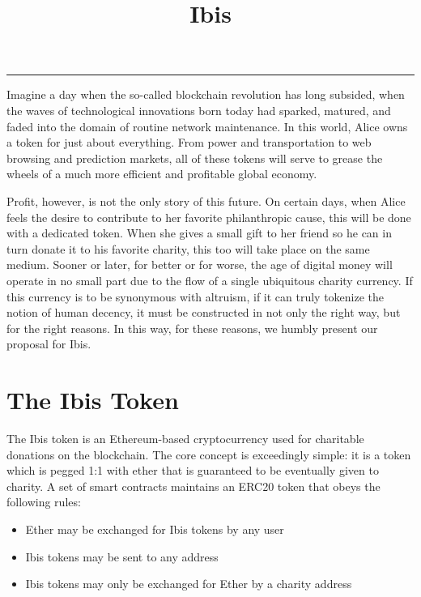 \documentclass{article} \usepackage{parskip} \usepackage{titlesec}
\title{\vspace{-5ex}Ibis} \date{\vspace{-10ex}}
\begin{document}
\maketitle
\noindent\rule{\textwidth}{1pt}

Imagine a day when the so-called blockchain revolution has long subsided, when
the waves of technological innovations born today had sparked, matured, and
faded into the domain of routine network maintenance. In this world, Alice owns
a token for just about everything. From power and transportation to web browsing
and prediction markets, all of these tokens will serve to grease the wheels of a
much more efficient and profitable global economy.

Profit, however, is not the only story of this future. On certain days, when
Alice feels the desire to contribute to her favorite philanthropic cause, this
will be done with a dedicated token. When she gives a small gift to her friend
so he can in turn donate it to his favorite charity, this too will take place on
the same medium. Sooner or later, for better or for worse, the age of digital
money will operate in no small part due to the flow of a single ubiquitous
charity currency. If this currency is to be synonymous with altruism, if it can
truly tokenize the notion of human decency, it must be constructed in not only
the right way, but for the right reasons. In this way, for these reasons, we
humbly present our proposal for Ibis.

\section{The Ibis Token}

The Ibis token is an Ethereum-based cryptocurrency used for charitable donations
on the blockchain. The core concept is exceedingly simple: it is a token which
is pegged 1:1 with ether that is guaranteed to be eventually given to charity. A
set of smart contracts maintains an ERC20 token that obeys the following rules:

\begin{itemize}
\item Ether may be exchanged for Ibis tokens by any user
\item Ibis tokens may be sent to any address
\item Ibis tokens may only be exchanged for Ether by a charity address
\end{itemize}
\end{document}
